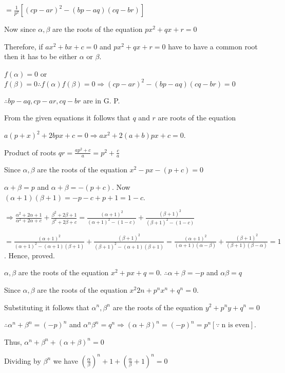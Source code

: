   $= \frac{1}{p^2}[(cp - ar)^2 - (bp - aq)(cq - br)]$

  Now since $\alpha, \beta$ are the roots of the equation $px^2 + qx + r = 0$

  Therefore, if $ax^2 + bx + c = 0$ and $px^2 + qx + r = 0$ have to have a common root then it has to be
  either $\alpha$ or $\beta$.

  $f(\alpha) = 0$ or $f(\beta) = 0 \therefore f(\alpha)f(\beta) = 0\Rightarrow (cp - ar)^2 - (bp - aq)(cq -
  br) = 0$

  $\therefore bp - aq, cp - ar, cq - br$ are in G. P.
\item From the given equations it follows that $q$ and $r$ are roots of the equation

  $a(p + x)^2 + 2bpx + c = 0 \Rightarrow ax^2 + 2(a + b)px + c = 0$.

  Product of roots $qr = \frac{ap^2 + c}{a} = p^2 + \frac{c}{a}$
\item Since $\alpha, \beta$ are the roots of the equation $x^2 - px - (p + c) = 0$

  $\alpha + \beta = p$ and $\alpha + \beta = -(p + c)$. Now $(\alpha + 1)(\beta + 1) = -p - c + p + 1 = 1 - c$.

  $\Rightarrow \frac{\alpha^2 + 2\alpha + 1}{\alpha^2 + 2\alpha + c} + \frac{\beta^2 + 2\beta + 1}{\beta^2 +
  2\beta + c} = \frac{(\alpha + 1)^2}{(\alpha + 1)^2 - (1 - c)} + \frac{(\beta + 1)^2}{(\beta + 1)^2 - (1 -
    c)}$

  $= \frac{(\alpha + 1)^2}{(\alpha + 1)^2 - (\alpha + 1)(\beta + 1)} + \frac{(\beta + 1)^2}{(\beta + 1)^2 -
    (\alpha + 1)(\beta + 1)} = \frac{(\alpha + 1)^2}{(\alpha + 1)(\alpha - \beta)} + \frac{(\beta +
  1)^2}{(\beta + 1)(\beta - \alpha)} = 1$. Hence, proved.
\item $\alpha, \beta$ are the roots of the equation $x^2 + px + q = 0$. $\therefore \alpha + \beta = -p$ and
  $\alpha\beta = q$

  Since $\alpha, \beta$ are the roots of the equation $x^2{2n} + p^nx^n + q^n = 0$.

  Substituting it follows that $\alpha^n, \beta^n$ are the roots of the equation $y^2 + p^ny + q^n = 0$

  $\therefore \alpha^n + \beta^n = (-p)^n$ and $\alpha^n\beta^n = q^n\Rightarrow (\alpha + \beta)^n = (-p)^n
  = p^n [\because\;\text{n is even}]$.

  Thus, $\alpha^n + \beta^n + (\alpha + \beta)^n = 0$

  Dividing by $\beta^n$ we have $\left(\frac{\alpha}{\beta}\right)^n + 1 + \left(\frac{\alpha}{\beta} + 1\right)^n = 0$


